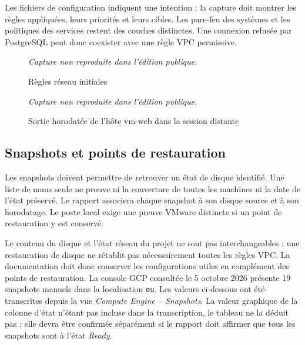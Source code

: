 \documentclass[a4paper,12pt]{report}
\newcommand{\publiccapture}[1]{%
  \begin{figure}[H]\centering
  {\footnotesize\itshape Capture non reproduite dans l'édition publique.}
  \caption{#1}\end{figure}}
\begin{document}
Les fichiers de configuration indiquent une intention ; la capture doit montrer les règles appliquées, leurs priorités et leurs cibles. Les pare-feu des systèmes et les politiques des services restent des couches distinctes. Une connexion refusée par PostgreSQL peut donc coexister avec une règle VPC permissive.
\publiccapture{Règles réseau initiales}
\publiccapture{Sortie horodatée de l'hôte vm-web dans la session distante}

\subsection{Snapshots et points de restauration}
Les snapshots doivent permettre de retrouver un état de disque identifié. Une liste de noms seule ne prouve ni la couverture de toutes les machines ni la date de l'état préservé. Le rapport associera chaque snapshot à son disque source et à son horodatage. Le poste local exige une preuve VMware distincte si un point de restauration y est conservé.

Le contenu du disque et l'état réseau du projet ne sont pas interchangeables : une restauration de disque ne rétablit pas nécessairement toutes les règles VPC. La documentation doit donc conserver les configurations utiles en complément des points de restauration.
La console GCP consultée le 5 octobre 2026 présente 19 snapshots manuels dans la localisation \texttt{eu}. Les valeurs ci-dessous ont été transcrites depuis la vue \emph{Compute Engine -- Snapshots}. La valeur graphique de la colonne d'état n'étant pas incluse dans la transcription, le tableau ne la déduit pas ; elle devra être confirmée séparément si le rapport doit affirmer que tous les snapshots sont à l'état \emph{Ready}.
\end{document}
